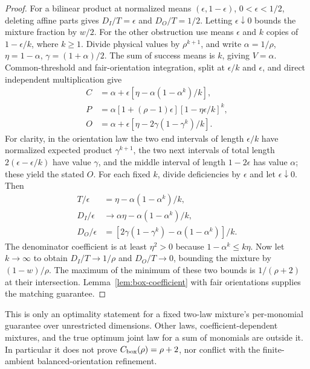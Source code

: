 \begin{proof}
For a bilinear product at normalized means $(\epsilon,1-\epsilon)$,
$0<\epsilon<1/2$, deleting affine parts gives
$D_I/T=\epsilon$ and $D_O/T=1/2$. Letting $\epsilon\downarrow0$
bounds the mixture fraction by $w/2$.
For the other obstruction use means $\epsilon$ and $k$ copies of
$1-\epsilon/k$, where $k\ge1$. Divide physical values by $\rho^{k+1}$,
and write $\alpha=1/\rho$, $\eta=1-\alpha$, $\gamma=(1+\alpha)/2$.
The sum of success means is $k$, giving $V=\alpha$.
Common-threshold and fair-orientation integration, split at
$\epsilon/k$ and $\epsilon$, and direct independent multiplication give
\[
 \begin{split}
 C&=\alpha+\epsilon[\eta-\alpha(1-\alpha^k)/k],\\
 P&=\alpha[1+(\rho-1)\epsilon][1-\eta\epsilon/k]^k,\\
 O&=\alpha+\epsilon[\eta-2\gamma(1-\gamma^k)/k].
 \end{split}
\]
For clarity, in the orientation law the two end intervals of length
$\epsilon/k$ have normalized expected product $\gamma^{k+1}$,
the two next intervals of total length $2(\epsilon-\epsilon/k)$
have value $\gamma$, and the middle interval of length $1-2\epsilon$
has value $\alpha$; these yield the stated $O$.
For each fixed $k$, divide deficiencies by $\epsilon$ and let
$\epsilon\downarrow0$. Then
\[
 \begin{split}
 T/\epsilon&=\eta-\alpha(1-\alpha^k)/k,\\
 D_I/\epsilon&\longrightarrow\alpha\eta-\alpha(1-\alpha^k)/k,\\
 D_O/\epsilon&=[2\gamma(1-\gamma^k)-\alpha(1-\alpha^k)]/k.
 \end{split}
\]
The denominator coefficient is at least $\eta^2>0$ because
$1-\alpha^k\le k\eta$. Now let $k\to\infty$ to obtain
$D_I/T\to1/\rho$ and $D_O/T\to0$, bounding the mixture by
$(1-w)/\rho$. The maximum of the minimum of these two bounds is
$1/(\rho+2)$ at their intersection. Lemma~\ref{lem:box-coefficient}
with fair orientations supplies the matching guarantee.
\end{proof}
This is only an optimality statement for a fixed two-law mixture's
per-monomial guarantee over unrestricted dimensions. Other laws,
coefficient-dependent mixtures, and the true optimum joint law for a
sum of monomials are outside it. In particular it does not prove
$C_{\rm box}(\rho)=\rho+2$, nor conflict with the finite-ambient
balanced-orientation refinement.
